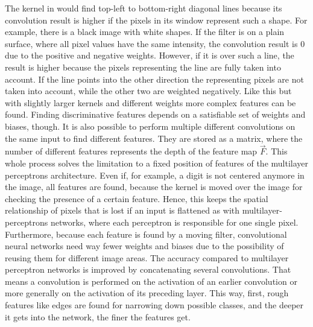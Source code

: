 The kernel in  would find top-left to bottom-right diagonal lines because its convolution result is higher if the pixels in its window represent such a shape.
For example, there is a black image with white shapes.
If the filter is on a plain surface, where all pixel values have the same intensity, the convolution result is 0 due to the positive and negative weights.
However, if it is over such a line, the result is higher because the pixels representing the line are fully taken into account.
If the line points into the other direction the representing pixels are not taken into account, while the other two are weighted negatively.
Like this but with slightly larger kernels and different weights more complex features can be found.
Finding discriminative features depends on a satisfiable set of weights and biases, though.
It is also possible to perform multiple different convolutions on the same input to find different features.
They are stored as a matrix, where the number of different features represents the depth of the feature map $\vec{F}$.
This whole process solves the limitation to a fixed position of features of the multilayer perceptrons architecture.
Even if, for example, a digit is not centered anymore in the image, all features are found, because the kernel is moved over the image for checking the presence of a certain feature.
Hence, this keeps the spatial relationship of pixels that is lost if an input is flattened as with multilayer-perceptrons networks, where each perceptron is responsible for one single pixel.
Furthermore, because each feature is found by a moving filter, convolutional neural networks need way fewer weights and biases due to the possibility of reusing them for different image areas.
The accuracy compared to multilayer perceptron networks is improved by concatenating several convolutions.
That means a convolution is performed on the activation of an earlier convolution or more generally on the activation of its preceding layer.
This way, first, rough features like edges are found for narrowing down possible classes, and the deeper it gets into the network, the finer the features get.
